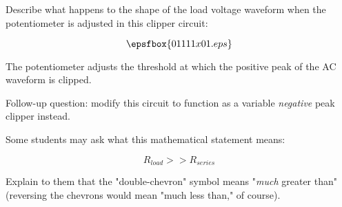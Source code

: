 

Describe what happens to the shape of the load voltage waveform when the potentiometer is adjusted in this clipper circuit:

$$\epsfbox{01111x01.eps}$$







The potentiometer adjusts the threshold at which the positive peak of the AC waveform is clipped.

\vskip 10pt

Follow-up question: modify this circuit to function as a variable {\it negative} peak clipper instead.







Some students may ask what this mathematical statement means:

$$R_{load} >> R_{series}$$

Explain to them that the "double-chevron" symbol means "{\it much} greater than" (reversing the chevrons would mean "much less than," of course).




